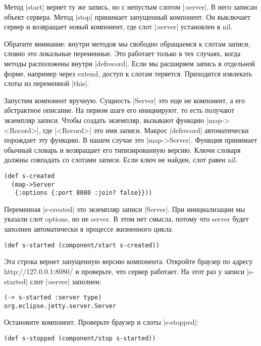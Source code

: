 Метод \spverb|start| вернет ту же запись, но с непустым слотом \spverb|:server|. В него
записан объект сервера. Метод \spverb|stop| принимает запущенный компонент. Он
выключает сервер и возвращает новый компонент, где слот \spverb|:server| установлен в
nil.

Обратите внимание: внутри методов мы свободно обращаемся к слотам записи, словно
это локальные переменные. Это работает только в тех случаях, когда методы
расположены внутри \spverb|defrecord|. Если мы расширяем запись в отдельной форме,
например через extend, доступ к слотам теряется. Приходится извлекать слоты из
переменной \spverb|this|.

Запустим компонент вручную. Сущность \spverb|Server| это еще не компонент, а его
абстрактное описание. На первом шаге его инициируют, то есть получают экземпляр
записи. Чтобы создать экземпляр, вызывают функцию \spverb|map-><Record>|, где
\spverb|<Record>| это имя записи. Макрос \spverb|defrecord| автоматически порождает эту
функцию. В нашем случае это \spverb|map->Server|. Функция принимает обычный словарь и
возвращает его типизированную версию. Ключи словаря должны совпадать со слотами
записи. Если ключ не найден, слот равен nil.

\begin{verbatim}
(def s-created
  (map->Server
   {:options {:port 8080 :join? false}}))
\end{verbatim}

Переменная \spverb|s-created| это экземпляр записи \spverb|Server|. При инициализации мы
указали слот options, но не server. В этом нет смысла, потому что server будет
заполнен автоматически в процессе жизненного цикла.

\begin{verbatim}
(def s-started (component/start s-created))
\end{verbatim}

Эта строка вернет запущенную версию компонента. Откройте браузер по адресу
http://127.0.0.1:8080/ и проверьте, что сервер работает. На этот раз у записи
\spverb|s-started| слот \spverb|:server| заполнен:

\begin{verbatim}
(-> s-started :server type)
org.eclipse.jetty.server.Server
\end{verbatim}

Остановите компонент. Проверьте браузер и слоты \spverb|s-stopped|:

\begin{verbatim}
(def s-stopped (component/stop s-started))
\end{verbatim}

